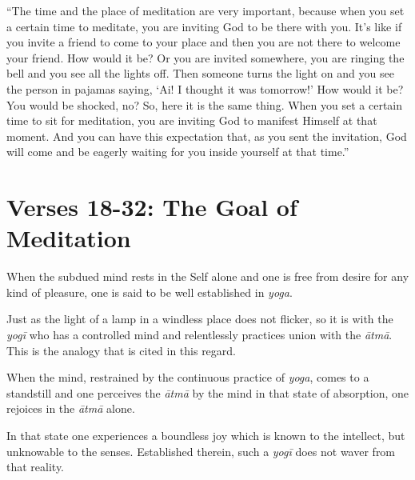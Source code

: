 \enquote{The time and the place of meditation are very important, because when you set a certain time to meditate, you are inviting God to be there with you. It’s like if you invite a friend to come to your place and then you are not there to welcome your friend. How would it be? Or you are invited somewhere, you are ringing the bell and you see all the lights off. Then someone turns the light on and you see the person in pajamas saying, \enquote{Ai! I thought it was tomorrow!} How would it be? You would be shocked, no? So, here it is the same thing. When you set a certain time to sit for meditation, you are inviting God to manifest Himself at that moment. And you can have this expectation that, as you sent the invitation, God will come and be eagerly waiting for you inside yourself at that time.}

\section{Verses 18-32: The Goal of Meditation}\label{sec-verses-18-32-the-goal-of-meditation}

{When the subdued mind rests in the Self alone and one is free from desire for any kind of pleasure, one is said to be well established in \textit{yoga}.}

{Just as the light of a lamp in a windless place does not flicker, so it is with the \textit{yogī} who has a controlled mind and relentlessly practices union with the \textit{ātmā}. This is the analogy that is cited in this regard.}

{When the mind, restrained by the continuous practice of \textit{yoga}, comes to a standstill and one perceives the \textit{ātmā} by the mind in that state of absorption, one rejoices in the \textit{ātmā} alone.}

{In that state one experiences a boundless joy which is known to the intellect, but unknowable to the senses. Established therein, such a \textit{yogī} does not waver from that reality.}

